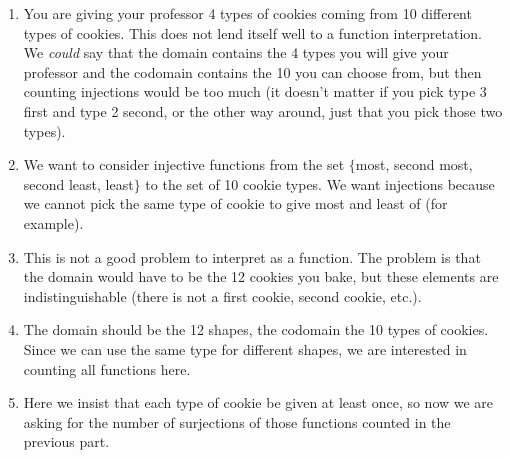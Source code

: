 \documentclass[10pt,]{book}
\theoremstyle{plain}
\theoremstyle{definition}
\theoremstyle{definition}
\theoremstyle{definition}
\numberwithin{equation}{section}
\begin{document}
\begin{exerciselist}
          \leavevmode%
\begin{enumerate}[label=(\alph*)]
\item\hypertarget{li-771}{}
                You are giving your professor 4 types of cookies coming from 10 different types of cookies. This does not lend itself well to a function interpretation. We \emph{could} say that the domain contains the 4 types you will give your professor and the codomain contains the 10 you can choose from, but then counting injections would be too much (it doesn't matter if you pick type 3 first and type 2 second, or the other way around, just that you pick those two types).
\item\hypertarget{li-772}{}
                We want to consider injective functions from the set \(\{\)most, second most, second least, least\(\}\) to the set of 10 cookie types. We want injections because we cannot pick the same type of cookie to give most and least of (for example).
\item\hypertarget{li-773}{}
                This is not a good problem to interpret as a function. The problem is that the domain would have to be the 12 cookies you bake, but these elements are indistinguishable (there is not a first cookie, second cookie, etc.).
\item\hypertarget{li-774}{}
                The domain should be the 12 shapes, the codomain the 10 types of cookies. Since we can use the same type for different shapes, we are interested in counting all functions here.
\item\hypertarget{li-775}{}
                Here we insist that each type of cookie be given at least once, so now we are asking for the number of surjections of those functions counted in the previous part.
\end{enumerate}

\end{exerciselist}
\typeout{************************************************}
\typeout{************************************************}
\end{document}

